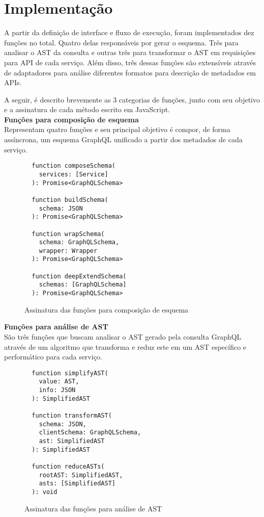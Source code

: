 \section{Implementação}

A partir da definição de interface e fluxo de execução, foram implementados dez funções no total. Quatro delas responsáveis por gerar o esquema. Três para analisar o AST da consulta e outras três para transformar o AST em requisições para API de cada serviço. Além disso, três dessas funções são extensíveis através de adaptadores para análise diferentes formatos para descrição de metadados em APIs. 

A seguir, é descrito brevemente as 3 categorias de funções, junto com seu objetivo e a assinatura de cada método escrito em JavaScript. \\

\textbf{Funções para composição de esquema} \\

Representam quatro funções e seu principal objetivo é compor, de forma assíncrona, um esquema GraphQL unificado a partir dos metadados de cada serviço.

\begin{figure}[H]
  \centering
  \begin{verbatim}
  function composeSchema(
    services: [Service]
  ): Promise<GraphQLSchema>

  function buildSchema(
    schema: JSON
  ): Promise<GraphQLSchema>

  function wrapSchema(
    schema: GraphQLSchema, 
    wrapper: Wrapper
  ): Promise<GraphQLSchema>

  function deepExtendSchema(
    schemas: [GraphQLSchema]
  ): Promise<GraphQLSchema>
  \end{verbatim}
  \caption{Assinatura das funções para composição de esquema}
\end{figure}

\textbf{Funções para análise de AST} \\

São três funções que buscam analisar o AST gerado pela consulta GraphQL através de um algoritmo que transforma e reduz este em um AST específico e performático para cada serviço.

\begin{figure}[H]
  \centering
  \begin{verbatim}
  function simplifyAST(
    value: AST, 
    info: JSON
  ): SimplifiedAST

  function transformAST(
    schema: JSON,
    clientSchema: GraphQLSchema, 
    ast: SimplifiedAST
  ): SimplifiedAST

  function reduceASTs(
    rootAST: SimplifiedAST, 
    asts: [SimplifiedAST]
  ): void
  \end{verbatim}
  \caption{Assinatura das funções para análise de AST}
\end{figure}


